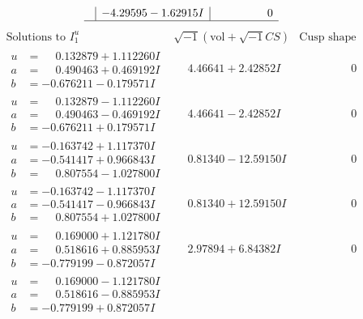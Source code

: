 \documentclass[1p]{elsarticle_modified}
\theoremstyle{definition}
\newcommand{\I}{\sqrt{-1}}
\begin{document}
$$\begin{array}{c|c|c}
 & -4.29595 - 1.62915 I & \phantom{-0.000000 } 0\\
 \hline 
 \end{array}$$\newpage$$\begin{array}{c|c|c}  
\text{Solutions to }I^u_{1}& \I (\text{vol} + \sqrt{-1}CS) & \text{Cusp shape}\\
 \hline 
\begin{aligned}
u &= \phantom{-}0.132879 + 1.112260 I \\
a &= \phantom{-}0.490463 + 0.469192 I \\
b &= -0.676211 - 0.179571 I\end{aligned}
 & \phantom{-}4.46641 + 2.42852 I & \phantom{-0.000000 } 0 \\ \hline\begin{aligned}
u &= \phantom{-}0.132879 - 1.112260 I \\
a &= \phantom{-}0.490463 - 0.469192 I \\
b &= -0.676211 + 0.179571 I\end{aligned}
 & \phantom{-}4.46641 - 2.42852 I & \phantom{-0.000000 } 0 \\ \hline\begin{aligned}
u &= -0.163742 + 1.117370 I \\
a &= -0.541417 + 0.966843 I \\
b &= \phantom{-}0.807554 - 1.027800 I\end{aligned}
 & \phantom{-}0.81340 - 12.59150 I & \phantom{-0.000000 } 0 \\ \hline\begin{aligned}
u &= -0.163742 - 1.117370 I \\
a &= -0.541417 - 0.966843 I \\
b &= \phantom{-}0.807554 + 1.027800 I\end{aligned}
 & \phantom{-}0.81340 + 12.59150 I & \phantom{-0.000000 } 0 \\ \hline\begin{aligned}
u &= \phantom{-}0.169000 + 1.121780 I \\
a &= \phantom{-}0.518616 + 0.885953 I \\
b &= -0.779199 - 0.872057 I\end{aligned}
 & \phantom{-}2.97894 + 6.84382 I & \phantom{-0.000000 } 0 \\ \hline\begin{aligned}
u &= \phantom{-}0.169000 - 1.121780 I \\
a &= \phantom{-}0.518616 - 0.885953 I \\
b &= -0.779199 + 0.872057 I\end{aligned}

\end{array}$$
\end{document}
